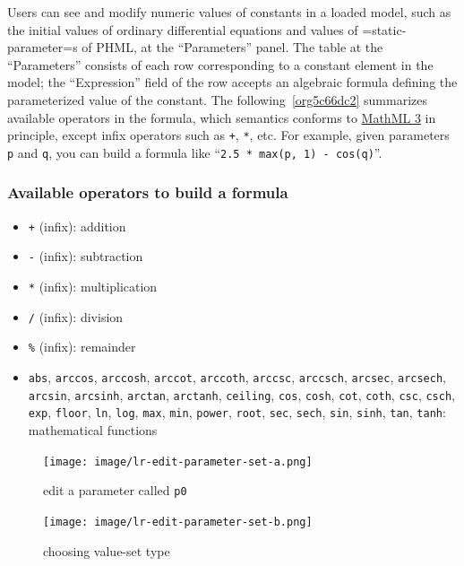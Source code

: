 \documentclass[a4paper,10pt]{report}
\begin{document}
Users can see and modify numeric values of constants in a loaded model,
such as the initial values of ordinary differential equations and values of
=static-parameter=s of PHML, at the ``Parameters'' panel.
The table at the ``Parameters'' consists of each row corresponding to a constant
element in the model; the ``Expression'' field of the row accepts an algebraic
formula defining the parameterized value of the constant.
The following~\ref{org5c66dc2} summarizes available operators in
the formula, which semantics conforms to \href{https://www.w3.org/TR/MathML3/}{MathML 3} in principle,
except infix operators such as \texttt{+}, \texttt{*}, etc.
For example, given parameters \texttt{p} and \texttt{q}, you can build a formula
like ``\texttt{2.5 * max(p, 1) - cos(q)}''.

\subsubsection{\label{org5c66dc2}Available operators to build a formula}
\label{sec:org8a68ae6}


\begin{itemize}
\item \texttt{+} (infix): addition
\item \texttt{-} (infix): subtraction
\item \texttt{*} (infix): multiplication
\item \texttt{/} (infix): division
\item \texttt{\%} (infix): remainder
\item \texttt{abs},
\texttt{arccos},
\texttt{arccosh},
\texttt{arccot},
\texttt{arccoth},
\texttt{arccsc},
\texttt{arccsch},
\texttt{arcsec},
\texttt{arcsech},
\texttt{arcsin},
\texttt{arcsinh},
\texttt{arctan},
\texttt{arctanh},
\texttt{ceiling},
\texttt{cos},
\texttt{cosh},
\texttt{cot},
\texttt{coth},
\texttt{csc},
\texttt{csch},
\texttt{exp},
\texttt{floor},
\texttt{ln},
\texttt{log},
\texttt{max},
\texttt{min},
\texttt{power},
\texttt{root},
\texttt{sec},
\texttt{sech},
\texttt{sin},
\texttt{sinh},
\texttt{tan},
\texttt{tanh}: mathematical functions
\end{itemize}

\begin{figure}[htbp]
\centering
\texttt{[image: image/lr-edit-parameter-set-a.png]}
\caption{\label{fig:orgf7d2934}edit a parameter called \texttt{p0}}
\end{figure}
\begin{figure}[htbp]
\centering
\texttt{[image: image/lr-edit-parameter-set-b.png]}
\caption{\label{fig:org4a20a29}choosing value-set type}
\end{figure}
\end{document}

